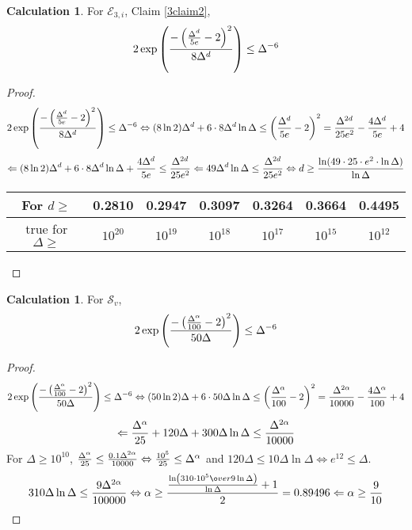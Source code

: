 \documentclass[12pt]{article}
\theoremstyle{definition}
\newtheorem{calculation}[theorem]{Calculation}
\newcommand{\lra}{\Leftrightarrow}
\newcommand{\la}{\Leftarrow}
\begin{document}
\begin{calculation}\label{3cal2}
For $\mathcal{E}_{3,i}$, Claim \ref{3claim2},
$$2\exp\left(  {-\left(  {\Delta^d\over 5e}-2  \right)^2\over 8\Delta^d}  \right)\leq \Delta^{-6}$$
\end{calculation}
\begin{proof}
$$2\exp\left(  {-\left(  {\Delta^d\over 5e}-2  \right)^2\over 8\Delta^d}  \right)\leq \Delta^{-6}
\lra (8\ln 2)\Delta^d + 6\cdot 8\Delta^d \ln \Delta \leq  {\left(  {\Delta^d\over 5e}-2  \right)^2} 
={\Delta^{2d}\over 25e^2}-{4\Delta^d\over 5e}+4$$
$$\la (8\ln 2)\Delta^d + 6\cdot 8\Delta^d \ln \Delta + {4\Delta^d\over 5e}\leq  {\Delta^{2d}\over 25e^2}
\la 49\Delta^d \ln \Delta \leq  {\Delta^{2d}\over 25e^2}
\lra d\geq {\ln(49\cdot 25\cdot e^2 \cdot \ln \Delta)\over \ln \Delta}
$$
\begin{center}
\begin{tabular}{c|c|c|c|c|c|c}
For $d\geq$ & 0.2810 & 0.2947 & 0.3097 & 0.3264 & 0.3664 & 0.4495 \\
\hline
true for $\Delta\geq$ & $10^{20}$ & $10^{19}$ & $10^{18}$ & $10^{17}$ & $10^{15}$ & $10^{12}$
\end{tabular}
\end{center}
\end{proof}

\begin{calculation}\label{4cal}
For $\mathcal{S}_v$,
$$2\exp{ \left( -\left( {\Delta^\alpha\over 100 } -2\right)^2 \over 50\Delta \right) }\leq \Delta^{-6}$$
\end{calculation}
\begin{proof}
$$2\exp{ \left( -\left( {\Delta^\alpha\over 100 } -2\right)^2 \over 50\Delta \right) }\leq \Delta^{-6}
\lra (50\ln 2)\Delta + 6\cdot 50\Delta \ln \Delta \leq  {\left(  {\Delta^\alpha\over 100 } -2  \right)^2} 
={\Delta^{2\alpha}\over 10000}-{4\Delta^\alpha\over 100}+4$$
$$ \la {\Delta^\alpha\over 25}+120\Delta + 300\Delta\ln \Delta \leq {\Delta^{2\alpha}\over 10000}$$
For $\Delta\geq 10^{10}$, ${\Delta^\alpha\over 25}\leq {0.1\Delta^{2\alpha}\over 10000} \lra {10^5\over 25}\leq \Delta^\alpha$ and $120\Delta\leq 10\Delta\ln \Delta \lra e^{12}\leq \Delta$.
$$310\Delta\ln \Delta\leq {9\Delta^{2\alpha }\over 100000}
\lra\alpha \geq { {\ln \left({310\cdot 10^5\o ver 9}\ln \Delta\right)\over \ln\Delta}+1\over 2}
=0.89496
\la \alpha\geq {9\over 10}$$
\end{proof}
\end{document}
